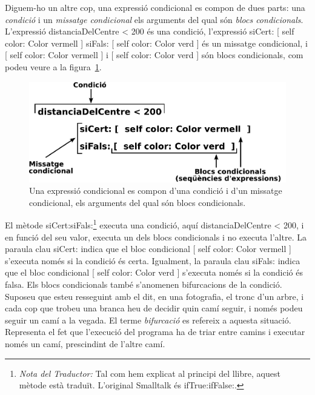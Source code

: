 Diguem-ho un altre cop, una expressió condicional es compon de dues parts: una \emph{condició} i un \emph{missatge condicional} els arguments del qual són \emph{blocs condicionals}. L'expressió \textsf{distanciaDelCentre \textless \hspace*{1mm}   200} és una condició, l'expressió  \textsf{siCert: [  self color: Color vermell  ] siFals: [  self color: Color verd  ]} és un missatge condicional, i  \textsf{[  self color: Color vermell  ]} i \textsf{[  self color: Color verd  ]} són blocs condicionals, com podeu veure a la figura~\ref{fig1801}.
\begin{figure}[h!]
\begin{center}
\includegraphics[scale=0.7]{Imatges/figura18-1.pdf}
\end{center}
\caption{Una expressió condicional es compon d'una condició i d'un missatge condicional, els arguments del qual són blocs condicionals.}
\label{fig1801}
\end{figure}

El mètode \textsf{siCert:siFals:}\footnote{\emph{Nota del Traductor:} Tal com hem explicat al principi del llibre, aquest mètode està traduït. L'original Smalltalk és \textsf{ifTrue:ifFalse:}.} executa una condició, aquí \textsf{distanciaDelCentre \textless \hspace*{1mm}   200}, i en funció del seu valor, executa un dels blocs condicionals i no executa l'altre. La paraula clau \textsf{siCert:} indica que el bloc condicional \textsf{[ self color: Color vermell ]} s'executa només si la condició és certa. Igualment, la paraula clau \textsf{siFals:} indica que el bloc condicional \textsf{[ self color: Color verd ]} s'executa només si la condició és falsa. Els blocs condicionals també s'anomenen bifurcacions de la condició. Suposeu que esteu resseguint amb el dit, en una fotografia, el tronc d'un arbre, i cada cop que trobeu una branca heu de decidir quin camí seguir, i només podeu seguir un camí a la vegada. El terme \emph{bifurcació} es refereix a aquesta situació. Representa el fet que l'execució del programa ha de triar entre camins i executar només un camí, prescindint de l'altre camí.

